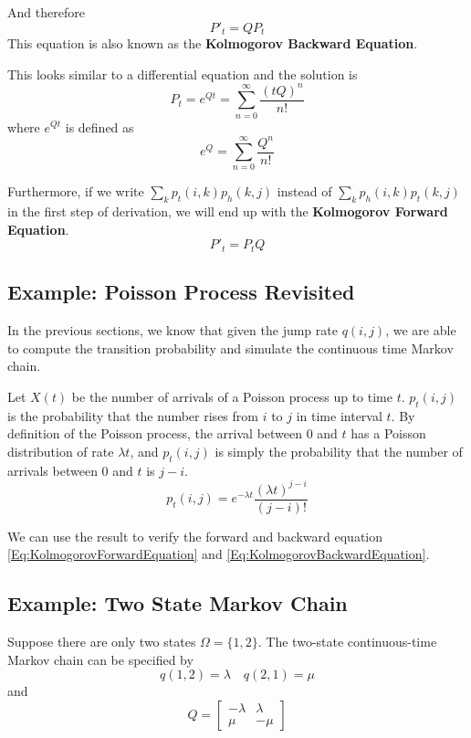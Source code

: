     And therefore
    \begin{equation}\label{Eq:KolmogorovBackwardEquation}
        P'_t = QP_t
    \end{equation}
    This equation is also known as the \textbf{Kolmogorov Backward Equation}.

    This looks similar to a differential equation and the solution is
    \[ P_t = e^{Qt} = \sum_{n=0}^{\infty}\frac{(tQ)^n}{n!} \]
    where $e^{Qt}$ is defined as
    \[ e^Q = \sum_{n=0}^{\infty} \frac{Q^n}{n!} \]

    Furthermore, if we write $\sum_{k}p_t(i,k)p_h(k,j)$ instead of $\sum_{k}p_h(i,k)p_t(k,j)$ in the first step of derivation, we will end up with the \textbf{Kolmogorov Forward Equation}.
    \begin{equation}\label{Eq:KolmogorovForwardEquation}
        P'_t = P_tQ
    \end{equation}

    \subsection{Example: Poisson Process Revisited}
        In the previous sections, we know that given the jump rate $q(i,j)$, we are able to compute the transition probability and simulate the continuous time Markov chain.

        Let $X(t)$ be the number of arrivals of a Poisson process up to time $t$. $p_t(i,j)$ is the probability that the number rises from $i$ to $j$ in time interval $t$. By definition of the Poisson process, the arrival between $0$ and $t$ has a Poisson distribution of rate $\lambda t$, and $p_t(i,j)$ is simply the probability that the number of arrivals between $0$ and $t$ is $j-i$.
        \[ p_t(i,j) = e^{-\lambda t}\frac{(\lambda t)^{j-i}}{(j-i)!} \]

        We can use the result to verify the forward and backward equation \ref{Eq:KolmogorovForwardEquation} and \ref{Eq:KolmogorovBackwardEquation}.

    \subsection{Example: Two State Markov Chain}
        Suppose there are only two states $\Omega = \{1,2\}$. The two-state continuous-time Markov chain can be specified by
        \[ q(1,2) = \lambda \quad q(2,1) = \mu \]
        and
        \[ Q = \begin{bmatrix}
            -\lambda & \lambda\\
            \mu & -\mu
        \end{bmatrix} \]

